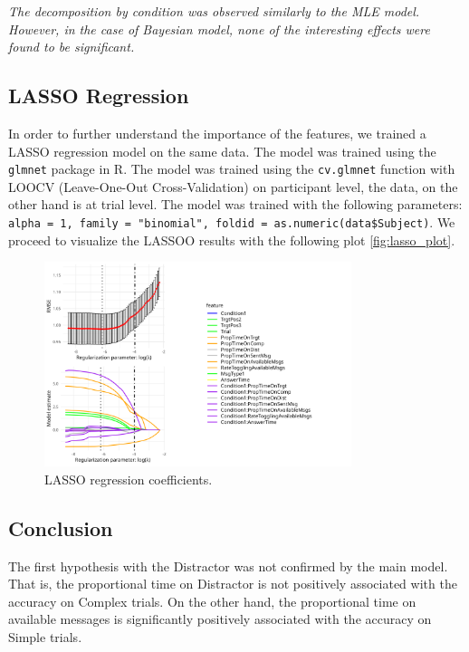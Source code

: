 \emph{The decomposition by condition was observed similarly to the MLE model. However, in the case of Bayesian model, none of the interesting effects were found to be significant. }



\subsection{LASSO Regression}
\label{sec:lasso_regression}
In order to further understand the importance of the features, we trained a LASSO regression model on the same data. The model was trained using the \texttt{glmnet} package in R. The model was trained using the \texttt{cv.glmnet} function with LOOCV (Leave-One-Out Cross-Validation) on participant level, the data, on the other hand is at trial level. The model was trained with the following parameters: \texttt{alpha = 1, family = "binomial", foldid = as.numeric(data\$Subject)}. We proceed to visualize the LASSOO results with the following plot \autoref{fig:lasso_plot}.

\begin{figure}[h!]
    \centering
    \includegraphics[width=0.8\textwidth]{images/lasso_plot_correct.png}
    \caption{LASSO regression coefficients.}
    \label{fig:lasso_plot}
\end{figure}




\subsection*{Conclusion}
The first hypothesis with the Distractor was not confirmed by the main model. That is, the proportional time on Distractor is not positively associated with the accuracy on Complex trials. On the other hand, the proportional time on available messages is significantly positively associated with the accuracy on Simple trials. 

